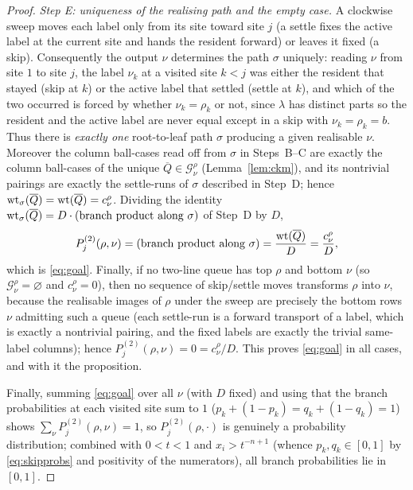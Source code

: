 \begin{proof}
\medskip
\noindent\emph{Step E: uniqueness of the realising path and the empty case.}
A clockwise sweep moves each label only from its site toward site $j$ (a settle
fixes the active label at the current site and hands the resident forward) or
leaves it fixed (a skip). Consequently the output $\nu$ determines the path
$\sigma$ uniquely: reading $\nu$ from site $1$ to site $j$, the label $\nu_k$ at a
visited site $k<j$ was either the resident that stayed (skip at $k$) or the active
label that settled (settle at $k$), and which of the two occurred is forced by
whether $\nu_k=\rho_k$ or not, since $\lambda$ has distinct parts so the resident
and the active label are never equal except in a skip with $\nu_k=\rho_k=b$.
Thus there is \emph{exactly one} root-to-leaf path $\sigma$ producing a given
realisable $\nu$. Moreover the column ball-cases read off from $\sigma$ in
Steps~B--C are exactly the column ball-cases of the unique
$\overline Q\in\mathcal G^\rho_\nu$ (Lemma~\ref{lem:ckm}), and its nontrivial pairings
are exactly the settle-runs of $\sigma$ described in Step~D; hence
$\operatorname{wt}_\sigma(\overline Q)=\operatorname{wt}(\overline Q)=c^\rho_\nu$. Dividing the identity
$\operatorname{wt}_\sigma(\overline Q)=D\cdot(\text{branch product along }\sigma)$ of Step~D
by $D$,
\[
P^{(2)}_j(\rho,\nu)=(\text{branch product along }\sigma)
=\frac{\operatorname{wt}(\overline Q)}{D}=\frac{c^\rho_\nu}{D},
\]
which is \eqref{eq:goal}. Finally, if no two-line queue has top $\rho$ and bottom
$\nu$ (so $\mathcal G^\rho_\nu=\varnothing$ and $c^\rho_\nu=0$), then no sequence of
skip/settle moves transforms $\rho$ into $\nu$, because the realisable images of
$\rho$ under the sweep are precisely the bottom rows $\nu$ admitting such a queue
(each settle-run is a forward transport of a label, which is exactly a nontrivial
pairing, and the fixed labels are exactly the trivial same-label columns); hence
$P^{(2)}_j(\rho,\nu)=0=c^\rho_\nu/D$. This proves \eqref{eq:goal} in all cases,
and with it the proposition.

Finally, summing \eqref{eq:goal} over all $\nu$ (with $D$ fixed) and using that
the branch probabilities at each visited site sum to $1$
($p_k+(1-p_k)=q_k+(1-q_k)=1$) shows $\sum_\nu P^{(2)}_j(\rho,\nu)=1$, so
$P^{(2)}_j(\rho,\cdot)$ is genuinely a probability distribution; combined with
$0<t<1$ and $x_i>t^{-n+1}$ (whence $p_k,q_k\in[0,1]$ by \eqref{eq:skipprobs} and
positivity of the numerators), all branch probabilities lie in $[0,1]$.
\end{proof}

